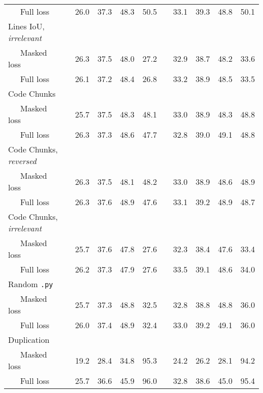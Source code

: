 \documentclass{standalone}
\begin{document}
\begin{table}
\begin{tabular}{lc cc>{\columncolor{gray!30}}cc c cc>{\columncolor{gray!30}}cc}
    ~~~Full loss & & 26.0 & 37.3 & 48.3 & 50.5 & & 33.1 & 39.3 & 48.8 & 50.1 \\
    \cmidrule(lr){1-1}
    Lines IoU, \textit{irrelevant} & & & & & & & & & & \\
    ~~~Masked loss & & 26.3 & 37.5 & 48.0 & 27.2 & & 32.9 & 38.7 & 48.2 & 33.6 \\
    ~~~Full loss & & 26.1 & 37.2 & 48.4 & 26.8 & & 33.2 & 38.9 & 48.5 & 33.5 \\
    \cmidrule(lr){1-1}
    Code Chunks & & & & & & & & & & \\
    ~~~Masked loss & & 25.7 & 37.5 & 48.3 & 48.1 & & 33.0 & 38.9 & 48.3 & 48.8 \\
    ~~~Full loss & & 26.3 & 37.3 & 48.6 & 47.7 & & 32.8 & 39.0 & 49.1 & 48.8 \\
    \cmidrule(lr){1-1}
    Code Chunks, \textit{reversed} & & & & & & & & & & \\
    ~~~Masked loss & & 26.3 & 37.5 & 48.1 & 48.2 & & 33.0 & 38.9 & 48.6 & 48.9 \\
    ~~~Full loss & & 26.3 & 37.6 & 48.9 & 47.6 & & 33.1 & 39.2 & 48.9 & 48.7 \\
    \cmidrule(lr){1-1}
    Code Chunks, \textit{irrelevant} & & & & & & & & & & \\
    ~~~Masked loss & & 25.7 & 37.6 & 47.8 & 27.6 & & 32.3 & 38.4 & 47.6 & 33.4 \\
    ~~~Full loss & & 26.2 & 37.3 & 47.9 & 27.6 & & 33.5 & 39.1 & 48.6 & 34.0 \\
    \cmidrule(lr){1-1}
    Random \texttt{.py} & & & & & & & & & & \\
    ~~~Masked loss & & 25.7 & 37.3 & 48.8 & 32.5 & & 32.8 & 38.8 & 48.8 & 36.0 \\
    ~~~Full loss & & 26.0 & 37.4 & 48.9 & 32.4 & & 33.0 & 39.2 & 49.1 & 36.0 \\
    \midrule
    Duplication & & & & & & & & & & \\
    ~~~Masked loss & & 19.2 & 28.4 & 34.8 & 95.3 & & 24.2 & 26.2 & 28.1 & 94.2 \\
    ~~~Full loss & & 25.7 & 36.6 & 45.9 & 96.0 & & 32.8 & 38.6 & 45.0 & 95.4 \\
    
    \bottomrule
    \end{tabular}
\end{table}
\end{document}
